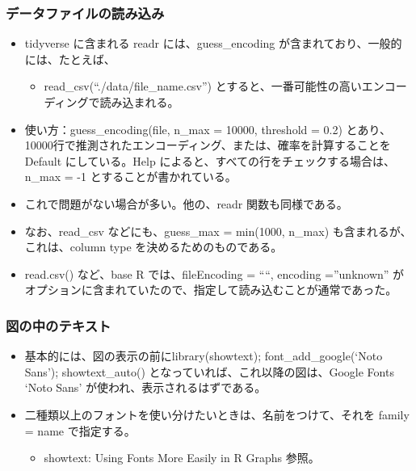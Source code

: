 \documentclass[
]{bxjsbook}
\providecommand{\tightlist}{%
  \setlength{\itemsep}{0pt}\setlength{\parskip}{0pt}}
\theoremstyle{definition}
\theoremstyle{definition}
\theoremstyle{definition}
\theoremstyle{definition}
\theoremstyle{remark}
\begin{document}
\hypertarget{ux30c7ux30fcux30bfux30d5ux30a1ux30a4ux30ebux306eux8aadux307fux8fbcux307f}{%
\subsubsection{データファイルの読み込み}\label{ux30c7ux30fcux30bfux30d5ux30a1ux30a4ux30ebux306eux8aadux307fux8fbcux307f}}

\begin{itemize}
\tightlist
\item
  tidyverse に含まれる readr には、guess\_encoding が含まれており、一般的には、たとえば、

  \begin{itemize}
  \tightlist
  \item
    read\_csv(``./data/file\_name.csv'') とすると、一番可能性の高いエンコーディングで読み込まれる。
  \end{itemize}
\item
  使い方：guess\_encoding(file, n\_max = 10000, threshold = 0.2) とあり、10000行で推測されたエンコーディング、または、確率を計算することを Default にしている。Help によると、すべての行をチェックする場合は、n\_max = -1 とすることが書かれている。
\item
  これで問題がない場合が多い。他の、readr 関数も同様である。
\item
  なお、read\_csv などにも、guess\_max = min(1000, n\_max) も含まれるが、これは、column type を決めるためのものである。
\item
  read.csv() など、base R では、fileEncoding = ````, encoding =''unknown'' がオプションに含まれていたので、指定して読み込むことが通常であった。
\end{itemize}

\hypertarget{ux56f3ux306eux4e2dux306eux30c6ux30adux30b9ux30c8}{%
\subsubsection{図の中のテキスト}\label{ux56f3ux306eux4e2dux306eux30c6ux30adux30b9ux30c8}}

\begin{itemize}
\tightlist
\item
  基本的には、図の表示の前にlibrary(showtext); font\_add\_google(`Noto Sans'); showtext\_auto() となっていれば、これ以降の図は、Google Fonts `Noto Sans' が使われ、表示されるはずである。
\item
  二種類以上のフォントを使い分けたいときは、名前をつけて、それを family = name で指定する。

  \begin{itemize}
  \tightlist
  \item
    showtext: Using Fonts More Easily in R Graphs 参照。
  \end{itemize}
\end{itemize}
\end{document}
